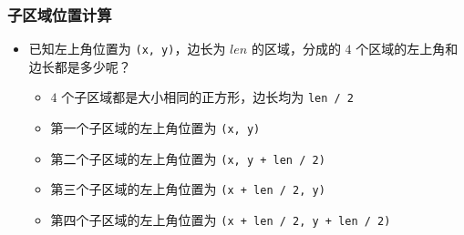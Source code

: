 \begin{frame}[fragile]
    \frametitle{子区域位置计算}

    \begin{itemize}[<+->]
        \item 已知左上角位置为 \lstinline|(x, y)|，边长为 $len$ 的区域，分成的 $4$ 个区域的左上角和边长都是多少呢？
        \begin{itemize}
            \item<2-> $4$ 个子区域都是大小相同的正方形，边长均为 \lstinline|len / 2|
            \item<3-> 第一个子区域的左上角位置为 \lstinline|(x, y)|
            \item<4-> 第二个子区域的左上角位置为 \lstinline|(x, y + len / 2)|
            \item<5-> 第三个子区域的左上角位置为 \lstinline|(x + len / 2, y)|
            \item<6-> 第四个子区域的左上角位置为 \lstinline|(x + len / 2, y + len / 2)|
        \end{itemize}
    \end{itemize}
    
\end{frame}

